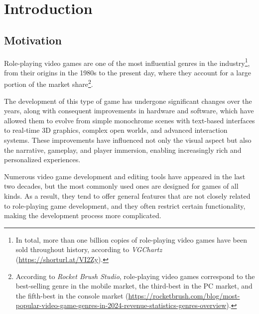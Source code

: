 \chapter*{Introduction}
\label{cap:introduction}



\section*{Motivation}
Role-playing video games are one of the most influential genres in the industry\footnote{In total, more than one billion copies of role-playing video games have been sold throughout history, according to \textit{VGChartz} (\url{https://shorturl.at/VI2Zy}).}, from their origins in the 1980s to the present day, where they account for a large portion of the market share\footnote{According to \textit{Rocket Brush Studio}, role-playing video games correspond to the best-selling genre in the mobile market, the third-best in the PC market, and the fifth-best in the console market (\url{https://rocketbrush.com/blog/most-popular-video-game-genres-in-2024-revenue-statistics-genres-overview}).}.

\smallskip

The development of this type of game has undergone significant changes over the years, along with consequent improvements in hardware and software, which have allowed them to evolve from simple monochrome scenes with text-based interfaces to real-time 3D graphics, complex open worlds, and advanced interaction systems. These improvements have influenced not only the visual aspect but also the narrative, gameplay, and player immersion, enabling increasingly rich and personalized experiences.

\medskip

Numerous video game development and editing tools have appeared in the last two decades, but the most commonly used ones are designed for games of all kinds. As a result, they tend to offer general features that are not closely related to role-playing game development, and they often restrict certain functionality, making the development process more complicated.

\smallskip

